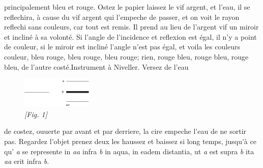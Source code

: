 principalement bleu et rouge. Ostez le papier laissez le vif argent\protect{}, et l'eau, il se reflechira, \`{a} cause du vif argent\protect{} qui l'empeche de passer, et on voit le rayon\protect{} reflechi sans couleurs\protect{}, car tout est remis. Il prend  au lieu de l'argent vif\protect{} un miroir\protect{} et inclin\'{e} \`{a} sa volont\'{e}. Si l'angle  de l'incidence\protect{}\protect{}\protect{}  et reflexion\protect{}\protect{} est \'{e}gal, il n'y a point de couleur, si le miroir\protect{} est inclin\'{e}  l'angle n'est pas \'{e}gal, et voila les couleurs\protect{}\protect{} couleur, bleu rouge, bleu rouge, bleu rouge; rien, rouge bleu, rouge bleu, rouge bleu, de l'autre cost\'{e}.\pend \pstart Instrument \`{a} Niveller\protect{}. Versez de l'eau 
              \begin{figure}                    
              \includegraphics[width=0.3\textwidth]{images/35_3A_8_27r}
              \\\centering\textit{[Fig. 1]}
              \end{figure}
            de costez, ouuerte par avant et par derriere, la cire empeche l'eau  de ne sortir pas. Regardez l'objet prenez deux  les  haussez et baissez si long temps, jusqu'\`{a} ce qu' \textit{a} se represente in \textit{aa} infra \textit{b} in aqua, in eadem  distantia, ut \textit{a} est supra \textit{b} ita \textit{aa} erit infra \textit{b}.\pend 